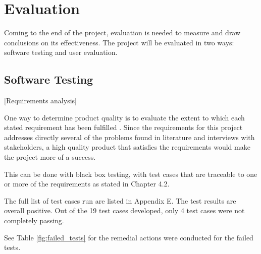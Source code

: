 \chapter{Evaluation}

Coming to the end of the project, evaluation is needed to measure and draw conclusions
on its effectiveness. The project will be evaluated in two ways:
software testing and user evaluation.

\section{Software Testing}

[Requirements analysis]

One way to determine product quality is to evaluate the extent to which each stated requirement 
has been fulfilled \citep{bach1999risk}. Since the requirements for this project addresses directly 
several of the problems found in literature and interviews with stakeholders, a high quality product 
that satisfies the requirements would make the project more of a success.

This can be done with black box testing, with test cases that are traceable to one or more of 
the requirements as stated in Chapter 4.2.

The full list of test cases run are listed in Appendix E. The test results are overall positive. 
Out of the 19 test cases developed, only 4 test cases were not completely passing.

See Table \ref{fig:failed_tests} for the remedial actions were conducted for the failed tests.

